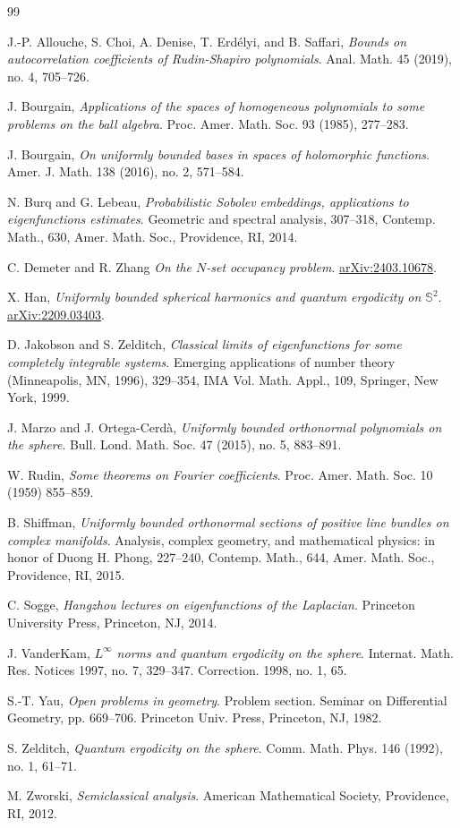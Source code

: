 \documentclass[12pt,reqno]{amsart}
\theoremstyle{plain}
\theoremstyle{remark}
\numberwithin{equation}{section}
\begin{document}
\begin{thebibliography}{99}

 J.-P. Allouche, S. Choi, A. Denise, T. Erd\'elyi, and B. Saffari,
\textit{Bounds on autocorrelation coefficients of Rudin-Shapiro polynomials}. Anal. Math. 45 (2019), no. 4, 705--726.

 J. Bourgain,
\textit{Applications of the spaces of homogeneous polynomials to some problems on the ball algebra}. Proc. Amer. Math. Soc. 93 (1985), 277--283.

 J. Bourgain,
\textit{On uniformly bounded bases in spaces of holomorphic functions}. Amer. J. Math. 138 (2016), no. 2, 571--584.

 N. Burq and G. Lebeau,
\textit{Probabilistic Sobolev embeddings, applications to eigenfunctions estimates}. Geometric and spectral analysis, 307--318, Contemp. Math., 630, Amer. Math. Soc., Providence, RI, 2014.

 C. Demeter and R. Zhang
\textit{On the $N$-set occupancy problem}. \href{https://arxiv.org/abs/2403.10678}{arXiv:2403.10678}.

 X. Han,
\textit{Uniformly bounded spherical harmonics and quantum ergodicity on $\mathbb{S}^2$}. \href{https://arxiv.org/abs/2209.03403}{arXiv:2209.03403}.

 D. Jakobson and S. Zelditch, 
\textit{Classical limits of eigenfunctions for some completely integrable systems}. Emerging applications of number theory (Minneapolis, MN, 1996), 329--354, IMA Vol. Math. Appl., 109, Springer, New York, 1999.

 J. Marzo and J. Ortega-Cerd\`a, 
\textit{Uniformly bounded orthonormal polynomials on the sphere}. Bull. Lond. Math. Soc. 47 (2015), no. 5, 883--891. 

 W. Rudin, 
\textit{Some theorems on Fourier coefficients}. Proc. Amer. Math. Soc. 10 (1959) 855--859.

 B. Shiffman, 
\textit{Uniformly bounded orthonormal sections of positive line bundles on complex manifolds}. Analysis, complex geometry, and mathematical physics: in honor of Duong H. Phong, 227--240, Contemp. Math., 644, Amer. Math. Soc., Providence, RI, 2015.

 C. Sogge,
\textit{Hangzhou lectures on eigenfunctions of the Laplacian}. Princeton University Press, Princeton, NJ, 2014.

 J. VanderKam, 
\textit{$L^\infty$ norms and quantum ergodicity on the sphere}. Internat. Math. Res. Notices 1997, no. 7, 329--347. Correction. 1998, no. 1, 65.

 S.-T. Yau,
\textit{Open problems in geometry}. Problem section. Seminar on Differential Geometry, pp. 669--706. Princeton Univ. Press, Princeton, NJ, 1982.

 S. Zelditch,
\textit{Quantum ergodicity on the sphere}. Comm. Math. Phys. 146 (1992), no. 1, 61--71.

 M. Zworski,
\textit{Semiclassical analysis}. American Mathematical Society, Providence, RI, 2012.
\end{thebibliography}
\end{document}
